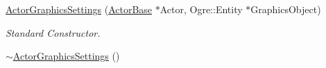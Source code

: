 \begin{DoxyCompactItemize}
\item 
\hyperlink{classphys_1_1ActorGraphicsSettings_a33472d07ddaaf630e4e7b8c94190df0a}{ActorGraphicsSettings} (\hyperlink{classphys_1_1ActorBase}{ActorBase} $\ast$Actor, Ogre::Entity $\ast$GraphicsObject)
\begin{DoxyCompactList}\small\item\em Standard Constructor. \item\end{DoxyCompactList}\item 
\hypertarget{classphys_1_1ActorGraphicsSettings_a3c6f9f1dd5bcceda2db65f1514313e14}{
\hyperlink{classphys_1_1ActorGraphicsSettings_a3c6f9f1dd5bcceda2db65f1514313e14}{$\sim$ActorGraphicsSettings} ()}
\label{dd/dd6/classphys_1_1ActorGraphicsSettings_a3c6f9f1dd5bcceda2db65f1514313e14}


\end{DoxyCompactItemize}
